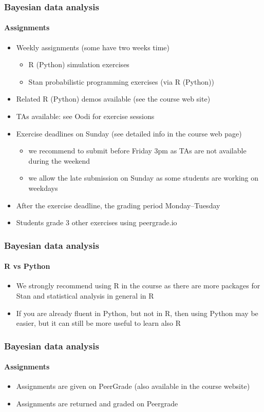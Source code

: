 \documentclass[english]{beamer}
\begin{document}
\begin{frame}
  \frametitle{Bayesian data analysis}  %
  \framesubtitle{Assignments}
  \begin{itemize}
  \item Weekly assignments (some have two weeks time)
    \begin{itemize}
    \item R (Python) simulation exercises
    \item Stan probabilistic programming exercises (via R (Python))
    \end{itemize}
  \item Related R (Python) demos available (see the course web site)
  \item TAs available: see Oodi for exercise sessions
  \item Exercise deadlines on Sunday (see detailed info in the course web page)
    \begin{itemize}
    \item we recommend to submit before Friday 3pm as TAs are not
      available during the weekend
    \item we allow the late submission on Sunday as some students are
      working on weekdays
    \end{itemize}
  \item After the exercise deadline, the grading period Monday--Tuesday
  \item Students grade 3 other exercises using peergrade.io
  \end{itemize}
  
\end{frame}

\begin{frame}
  \frametitle{Bayesian data analysis}  %
  \framesubtitle{R vs Python}

  \begin{itemize}
  \item We strongly recommend using R in the course as there are more
    packages for Stan and statistical analysis in general in R
  \item If you are already fluent in Python, but not in R, then using Python
    may be easier, but it can still be more useful to learn also R
  \end{itemize}
  
\end{frame}

\begin{frame}
  \frametitle{Bayesian data analysis}  %
  \framesubtitle{Assignments}
  \begin{itemize}
  \item Assignments are given on PeerGrade (also available in the course website)
  \item Assignments are returned and graded on Peergrade
  \end{itemize}
\end{frame}
\end{document}
